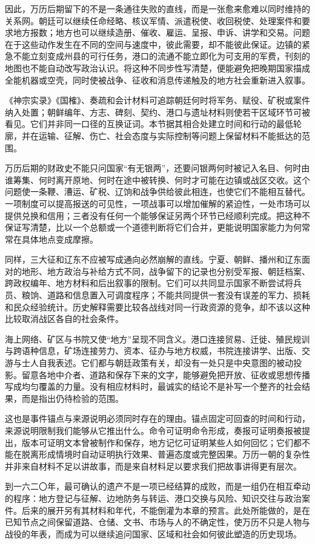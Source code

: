 因此，万历后期留下的不是一条通往失败的直线，而是一张愈来愈难以同时维持的关系网。朝廷可以继续任命经略、核议军情、派遣税使、收回税使、处理案件和要求地方报数；地方也可以继续造册、催收、雇运、呈报、申诉、讲学和交易。问题在于这些动作发生在不同的空间与速度中，彼此需要，却不能彼此保证。边镇的紧急不能立刻变成州县的可行任务，港口的流通不能立即化为可支用的军费，刊刻的地图也不能自动改写政治认识。将这种不同步性写清楚，便能避免把晚期国家描成全能机器或空壳，同时使被战争、征收和消息传递触及的地方社会重新进入叙事。

\begin{sourcenote}[怎样把连续年代同材料限度放在一起]
《神宗实录》《国榷》、奏疏和会计材料可追踪朝廷何时将军务、赋役、矿税或案件纳入处置；朝鲜编年、方志、碑刻、契约、港口与遗址材料则使若干区域环节可被看见。它们并非同一口径的互换证词。本节据其相合处建立时间和行动的最低轮廓，并在运输、征解、伤亡、社会态度与实际控制等问题上保留材料不能抵达的范围。
\end{sourcenote}

万历后期的财政史不能只问国家“有无银两”，还要问银两何时被记入名目、何时由谁筹集、何时离开原地、何时在途中被转换、何时才可能在边镇或战区交收。这个问题使一条鞭、漕运、矿税、辽饷和战争供给彼此相连，也使它们不能相互替代。一项制度可以提高报送的可见性，一项战事可以增加催解的紧迫性，一处市场可以提供兑换和信用；三者没有任何一个能够保证另两个环节已经顺利完成。把这种不保证写清楚，比以一个总额或一个道德判断将它们合并，更能说明国家能力为何常常在具体地点变成摩擦。

同样，三大征和辽东不应被写成通向必然崩解的直线。宁夏、朝鲜、播州和辽东面对的地形、地方政治与补给方式不同，战争留下的记录也分别受军报、朝廷档案、跨政权编年、地方材料和后出叙事的限制。它们可以共同显示国家不断尝试将兵员、粮饷、道路和信息置入可调度程序；不能共同提供一套没有误差的军力、损耗和民众经验统计。历史解释需要比较各战线对同一行政资源的竞争，却不该以这种比较取消战区各自的社会条件。

海上网络、矿区与书院又使“地方”呈现不同含义。港口连接贸易、迁徙、殖民规训与跨语种信息，矿场连接劳力、资本、征办与地方权威，书院连接讲学、出版、交游与士人自我表述。它们都与朝廷政策有关，却没有一处只是中央意图的被动投影。留意各地中介者、道路和保存下来的文字，能够避免把开放、征收或思想传播写成均匀覆盖的力量。没有相应材料时，最诚实的结论不是补写一个整齐的社会结果，而是指出仍待检验的范围。

这也是事件锚点与来源说明必须同时存在的理由。锚点固定可回查的时间和行动，来源说明限制我们能够从它推出什么。命令可证明命令形成，奏报可证明奏报被提出，版本可证明文本曾被制作和保存，地方记忆可证明某些人如何回忆；它们都不能在脱离形成情境时自动证明执行效果、普遍态度或完整因果。万历一朝的复杂性并非来自材料不足以讲故事，而是来自材料足以要求我们把故事讲得更有层次。

到一六二〇年，最可确认的遗产不是一项已经结算的成败，而是一组仍在相互牵动的程序：地方登记与征解、边地防务与转运、港口交换与风险、知识交往与政治案件。后来的展开另有其材料和年代，不能倒灌为本章的预言。此处所能做的，是在已知节点之间保留道路、仓储、文书、市场与人的不确定性，使万历不只是人物与战役的年表，而成为可以继续追问国家、区域和社会如何彼此塑造的历史现场。